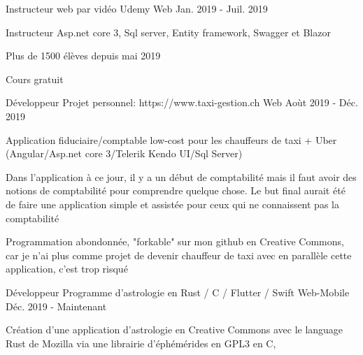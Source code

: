 

\begin{cventries}

  \cventry
    {Instructeur web par vidéo} %
    {Udemy} %
    {Web} %
    {Jan. 2019 - Juil. 2019} %
    {
      \begin{cvitems} %
        \item {Instructeur Asp.net core 3, Sql server, Entity framework, Swagger et Blazor}
        \item {Plus de 1500 élèves depuis mai 2019}
        \item {Cours gratuit}
      \end{cvitems}
    }

  \cventry
    {Développeur} %
    {Projet personnel: https://www.taxi-gestion.ch} %
    {Web} %
    {Aoùt 2019 - Déc. 2019} %
    {
      \begin{cvitems} %
        \item {Application fiduciaire/comptable low-cost pour les chauffeurs de taxi + Uber (Angular/Asp.net core 3/Telerik Kendo UI/Sql Server)}
        \item {Dans l'application à ce jour, il y a un début de comptabilité mais il faut avoir des notions de comptabilité pour comprendre quelque chose. Le but final aurait été de faire une application simple et assistée pour ceux qui ne connaissent pas la comptabilité}
        \item {Programmation abondonnée, "forkable" sur mon github en Creative Commons, car je n'ai plus comme projet de devenir chauffeur de taxi avec en parallèle cette application, c'est trop risqué}
      \end{cvitems}
    }

  \cventry
    {Développeur} %
    {Programme d'astrologie en Rust / C / Flutter / Swift} %
    {Web-Mobile} %
    {Déc. 2019 - Maintenant} %
    {
      \begin{cvitems} %
        \item {Création d'une application d'astrologie en Creative Commons avec le language Rust de Mozilla via une librairie d'éphémérides en GPL3 en C},
      \end{cvitems}
    }

\end{cventries}
